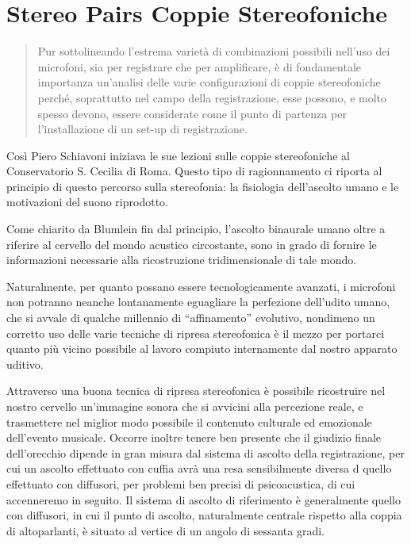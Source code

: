 \section{Stereo Pairs \newline Coppie Stereofoniche}

\begin{quote}
Pur sottolineando l’estrema varietà di combinazioni possibili nell’uso dei
microfoni, sia per registrare che per amplificare, è di fondamentale importanza
un’analisi delle varie configurazioni di coppie stereofoniche perché,
soprattutto nel campo della registrazione, esse possono, e molto spesso devono,
essere considerate come il punto di partenza per l’installazione di un set-up
di registrazione.
\end{quote}

Così  Piero Schiavoni iniziava le sue lezioni
sulle coppie stereofoniche al Conservatorio S. Cecilia di Roma. Questo tipo di
ragionnamento ci riporta al principio di questo percorso sulla stereofonia:
la fisiologia dell'ascolto umano e le motivazioni del suono riprodotto.

Come chiarito da Blumlein\cite{ab58} fin dal principio, l'ascolto binaurale umano
oltre a riferire al cervello del mondo acustico circostante, sono in grado di
fornire le informazioni necessarie alla ricostruzione tridimensionale di tale
mondo.


Naturalmente, per quanto possano
essere tecnologicamente avanzati, i microfoni non potranno neanche lontanamente
eguagliare la perfezione dell’udito umano, che si avvale di qualche millennio
di “affinamento” evolutivo, nondimeno un corretto uso delle varie tecniche di
ripresa stereofonica è il mezzo per portarci quanto più vicino possibile al
lavoro compiuto internamente dal nostro apparato uditivo.

Attraverso una buona tecnica di ripresa stereofonica è possibile ricostruire nel
nostro cervello un’immagine sonora che si avvicini alla percezione reale, e
trasmettere nel miglior modo possibile il contenuto culturale ed emozionale
dell’evento musicale. Occorre inoltre tenere ben presente che il giudizio finale
dell’orecchio dipende in gran misura dal sistema di ascolto della registrazione,
per cui un ascolto effettuato con cuffia avrà una resa sensibilmente diversa d
quello effettuato con diffusori, per problemi ben precisi di psicoacustica, di
cui accenneremo in seguito. Il sistema di ascolto di riferimento è generalmente
quello con diffusori, in cui il punto di ascolto, naturalmente centrale rispetto
alla coppia di altoparlanti, è situato al vertice di un angolo di sessanta gradi.

